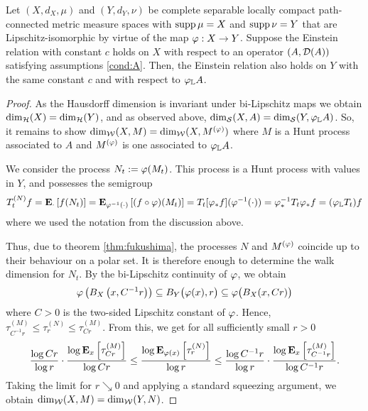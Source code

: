 \begin{prop}\label{prop:mmiso}
  Let $(X,d_X,\mu)$ and $(Y,d_Y,\nu)$ be complete separable locally compact path-connected metric measure spaces with $\supp\mu=X$ and $\supp\nu=Y$ that are Lipschitz-isomorphic by virtue of the map $\gp:X\to Y$. Suppose the Einstein relation with constant $c$ holds on $X$ with respect to an operator $(A,\cD(A))$ satisfying assumptions \ref{cond:A}. Then, the Einstein relation also holds on $Y$ with the same constant $c$ and with respect to $\gp_{\IL} A$.
\end{prop}
\begin{proof}
  As the Hausdorff dimension is invariant under bi-Lipschitz maps we obtain $\dimh(X)=\dimh(Y)$, and as observed above, $\dims(X,A)=\dims(Y,\gp_{\IL} A)$. So, it remains to show $\dimw(X,M)=\dimw(X,M^{(\gp)})$ where $M$ is a Hunt process associated to $A$ and $M^{(\gp)}$ is one associated to $\gp_{\IL} A$. 
  
  We consider the process $N_t:=\gp(M_t)$. This process is a Hunt process with values in $Y$, and possesses the semigroup
  \[
    T_t^{(N)}f
    =\PTEp{f(N_t)}{\cdot}
    =\PTEp{(f\circ\gp)(M_t)}{\gp^{-1}(\cdot)}
    =T_t[\gp_*f](\gp^{-1}(\cdot))
    =\gp_*^{-1}T_t\gp_* f
    =(\gp_{\IL} T_t)f
  \]
  where we used the notation from the discussion above. 
  
  Thus, due to theorem \ref{thm:fukushima}, the processes $N$ and $M^{(\gp)}$ coincide up to their behaviour on a polar set. It is therefore enough to determine the walk dimension for $N_t$. By the bi-Lipschitz continuity of $\gp$, we obtain 
  \[
    \gp\left(B_X\left(x,C^{-1}r\right)\right)
    \ssq B_Y\big(\gp(x),r\big) 
    \ssq \gp\big(B_X(x,Cr)\big)
  \]
  where $C>0$ is the two-sided Lipschitz constant of $\gp$. Hence, $\tau_{C^{-1}r}^{(M)}\leq \tau_r^{(N)}\leq \tau_{Cr}^{(M)}$. From this, we get for all sufficiently small $r>0$
  \[
    \frac{\log Cr}{\log r}
     \cdot\frac{\log \PTEp{\tau_{Cr}^{(M)}}{x}}{\log Cr}
    \leq \frac{\log \PTEp{\tau_r^{(N)}}{\gp(x)}}{\log r}
    \leq \frac{\log C^{-1}r}{\log r}
     \cdot\frac{\log \PTEp{\tau_{C^{-1}r}^{(M)}}{x}}{\log C^{-1}r}.
  \]
  Taking the limit for $r\searrow0$ and applying a standard squeezing argument, we obtain $\dimw(X,M)=\dimw(Y,N)$. 
\end{proof}
